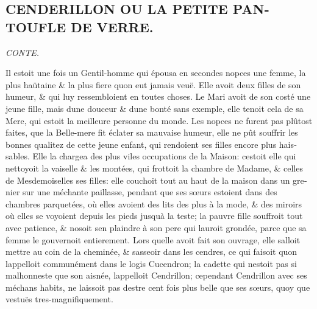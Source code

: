 \documentclass[14pt,a4paper]{memoir}
\begin{document}
\begin{otherlanguage}{french}
\section{CENDERILLON OU LA PETITE PANTOUFLE DE VERRE.}

\emph{CONTE.}

Il estoit une fois un Gentil-homme qui épousa en secondes nopces une
femme, la plus haütaine \& la plus fiere qu\textquotesingle on eut
jamais veuë. Elle avoit deux filles de son humeur, \& qui luy
ressembloient en toutes choses. Le Mari avoit de son costé une jeune
fille, mais d\textquotesingle une douceur \& d\textquotesingle une bonté
sans exemple, elle tenoit cela de sa Mere, qui estoit la meilleure
personne du monde. Les nopces ne furent pas plûtost faites, que la
Belle-mere fit éclater sa mauvaise humeur, elle ne pût souffrir les
bonnes qualitez de cette jeune enfant, qui rendoient ses filles encore
plus haissables. Elle la chargea des plus viles occupations de la
Maison: c\textquotesingle estoit elle qui nettoyoit la vaiselle \& les
montées, qui frottoit la chambre de Madame, \& celles de Mesdemoiselles
ses filles: elle couchoit tout au haut de la maison dans un grenier sur
une méchante paillasse, pendant que ses sœurs estoient dans des chambres
parquetées, où elles avoient des lits des plus à la mode, \& des miroirs
où elles se voyoient depuis les pieds jusqu\textquotesingle à la teste;
la pauvre fille souffroit tout avec patience, \& n\textquotesingle osoit
s\textquotesingle en plaindre à son pere qui l\textquotesingle auroit
grondée, parce que sa femme le gouvernoit entierement. Lors quelle avoit
fait son ouvrage, elle s\textquotesingle alloit mettre au coin de la
cheminée, \& s\textquotesingle asseoir dans les cendres, ce qui faisoit
qu\textquotesingle on l\textquotesingle appelloit communément dans le
logis Cucendron; la cadette qui n\textquotesingle estoit pas si
malhonneste que son aisnée, l\textquotesingle appelloit Cendrillon;
cependant Cendrillon avec ses méchans habits, ne laissoit pas
d\textquotesingle estre cent fois plus belle que ses sœurs, quoy que
vestuës tres-magnifiquement.


\end{otherlanguage}
\end{document}
